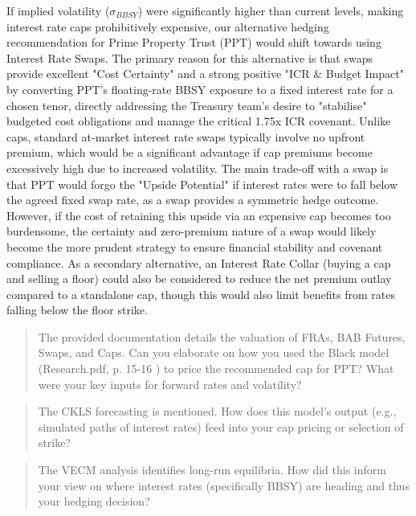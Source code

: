 \documentclass[11pt, a4paper, british]{article}
\begin{document}
If implied volatility ($\sigma_{BBSY}$) were significantly higher than current levels, making interest rate caps prohibitively expensive, our alternative hedging recommendation for Prime Property Trust (PPT) would shift towards using Interest Rate Swaps. The primary reason for this alternative is that swaps provide excellent "Cost Certainty" and a strong positive "ICR \& Budget Impact" by converting PPT's floating-rate BBSY exposure to a fixed interest rate for a chosen tenor, directly addressing the Treasury team's desire to "stabilise" budgeted cost obligations and manage the critical 1.75x ICR covenant. Unlike caps, standard at-market interest rate swaps typically involve no upfront premium, which would be a significant advantage if cap premiums become excessively high due to increased volatility. The main trade-off with a swap is that PPT would forgo the "Upside Potential" if interest rates were to fall below the agreed fixed swap rate, as a swap provides a symmetric hedge outcome. However, if the cost of retaining this upside via an expensive cap becomes too burdensome, the certainty and zero-premium nature of a swap would likely become the more prudent strategy to ensure financial stability and covenant compliance. As a secondary alternative, an Interest Rate Collar (buying a cap and selling a floor) could also be considered to reduce the net premium outlay compared to a standalone cap, though this would also limit benefits from rates falling below the floor strike.

\newpage

\begin{quote}
    The provided documentation details the valuation of FRAs, BAB Futures, Swaps, and Caps. Can you elaborate on how you used the Black model (Research.pdf, p. 15-16 ) to price the recommended cap for PPT? What were your key inputs for forward rates and volatility?
\end{quote}



\newpage

\begin{quote}
    The CKLS forecasting is mentioned. How does this model's output (e.g., simulated paths of interest rates) feed into your cap pricing or selection of strike?
\end{quote}



\newpage

\begin{quote}
    The VECM analysis identifies long-run equilibria. How did this inform your view on where interest rates (specifically BBSY) are heading and thus your hedging decision?
\end{quote}
\end{document}
